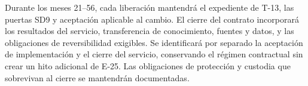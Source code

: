 Durante los meses 21--56, cada liberación mantendrá el expediente de T-13, las puertas SD9 y aceptación aplicable al cambio. El cierre del contrato incorporará los resultados del servicio, transferencia de conocimiento, fuentes y datos, y las obligaciones de reversibilidad exigibles. Se identificará por separado la aceptación de implementación y el cierre del servicio, conservando el régimen contractual sin crear un hito adicional de E-25. Las obligaciones de protección y custodia que sobrevivan al cierre se mantendrán documentadas.
